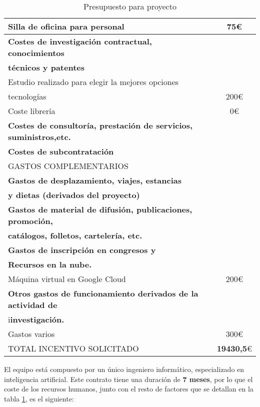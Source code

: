 \documentclass[11pt,fleqn]{book} %
\begin{document}
\begin{table}[H]
\begin{center}
\begin{tabular}{|l|c|}
			Silla de oficina para personal &  75\euro \\ \hline
			\cellcolor[gray]{0.8}\textbf{Costes de investigación contractual, conocimientos} \\
			\cellcolor[gray]{0.8}\textbf{técnicos y patentes} & \\ \hline
			Estudio realizado para elegir la mejores opciones \\
			tecnologías & 200\euro   \\ \hline
			Coste librería & 0\euro \\ \hline
			\cellcolor[gray]{0.8}\textbf{Costes de consultoría, prestación de servicios, suministros,etc.} &  \\ \hline
			\cellcolor[gray]{0.8}\textbf{Costes de subcontratación} &  \\ \hline
			\cellcolor[gray]{0.5}GASTOS COMPLEMENTARIOS &  \\ \hline
			\cellcolor[gray]{0.8}\textbf{Gastos de desplazamiento, viajes, estancias}    \\ 
			\cellcolor[gray]{0.8}\textbf{y dietas (derivados del proyecto)} &  \\ \hline
			\cellcolor[gray]{0.8}\textbf{Gastos de material de difusión, publicaciones, promoción,}   \\ 
			\cellcolor[gray]{0.8}\textbf{catálogos, folletos, cartelería, etc.} &  \\ \hline
			\cellcolor[gray]{0.8}\textbf{Gastos de inscripción en congresos y} \\
			\cellcolor[gray]{0.8}\textbf{Recursos en la nube.} &  \\ \hline
			Máquina virtual en Google Cloud &  200\euro \\ \hline
			\cellcolor[gray]{0.8}\textbf{Otros gastos de funcionamiento derivados de la actividad de} \\
			i\cellcolor[gray]{0.8}\textbf{investigación.} &  \\ \hline
			Gastos varios & 300\euro \\ \hline
			\cellcolor{red}TOTAL INCENTIVO SOLICITADO & \textbf{19430,5}\euro \\ \hline
		\end{tabular}
	\end{center}
	\caption{Presupuesto para proyecto}
	\label{tab:tabla1}
\end{table}

El equipo está compuesto por un único ingeniero informático, especializado en inteligencia artificial. Este contrato tiene una duración de \textbf{7 meses}, por lo que el coste de los recursos humanos, junto con el resto de factores que se detallan en la tabla \ref{tab:tabla1}, es el siguiente: \\
\end{document}
